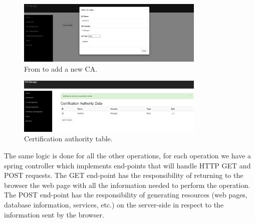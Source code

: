 \begin{figure}
	\centering
	\includegraphics[width=0.8\textwidth]{Figures/manager1}
	\caption{\label{fig:manager1}From to add a new CA.}
\end{figure}

\begin{figure}
	\centering
	\includegraphics[width=0.8\textwidth]{Figures/manager2}
	\caption{\label{fig:manager2}Certification authority table.}
\end{figure}


The same logic is done for all the other operations, for each operation we have a spring controller which implements end-points that will handle HTTP GET and POST requests. The GET end-point has the responsibility of returning to the browser the web page with all the information needed to perform the operation. The POST end-point has the responsibility of generating resources (web pages, database information, services, etc.) on the server-side in respect to the information sent by the browser.

